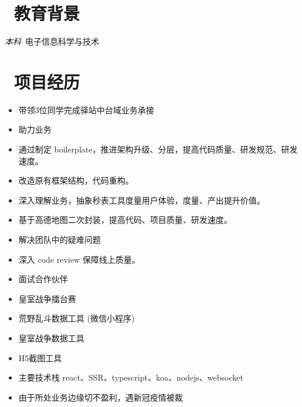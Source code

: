 \documentclass{resume}
\begin{document}


 
\section{\faGraduationCap\  教育背景}
\textit{本科}\ 电子信息科学与技术

\section{\faUsers\ 项目经历}
\begin{itemize}
  \item 带领3位同学完成驿站中台域业务承接
  \item 助力业务
  \item 通过制定 boilerplate，推进架构升级、分层，提高代码质量、研发规范、研发速度。
  \item 改造原有框架结构，代码重构。
  \item 深入理解业务，抽象秒表工具度量用户体验，度量、产出提升价值。
  \item 基于高德地图二次封装，提高代码、项目质量、研发速度。
  \item 解决团队中的疑难问题
  \item 深入 code review 保障线上质量。
  \item 面试合作伙伴
\end{itemize}

\begin{itemize}
    \item 皇室战争擂台赛
    \item 荒野乱斗数据工具 (微信小程序)
    \item 皇室战争数据工具
    \item H5截图工具
    \item 主要技术栈 react、SSR、typescript、koa、nodejs、websocket
    \item 由于所处业务边缘切不盈利，遇新冠疫情被裁
\end{itemize}
\end{document}
